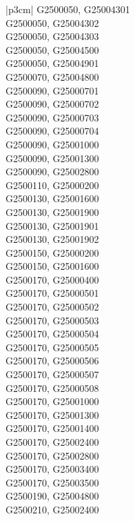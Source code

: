 \begin{customLongTable}{ |p{3cm}| }
G2500050, G25004301 \\ \hline
G2500050, G25004302 \\ \hline
G2500050, G25004303 \\ \hline
G2500050, G25004500 \\ \hline
G2500050, G25004901 \\ \hline
G2500070, G25004800 \\ \hline
G2500090, G25000701 \\ \hline
G2500090, G25000702 \\ \hline
G2500090, G25000703 \\ \hline
G2500090, G25000704 \\ \hline
G2500090, G25001000 \\ \hline
G2500090, G25001300 \\ \hline
G2500090, G25002800 \\ \hline
G2500110, G25000200 \\ \hline
G2500130, G25001600 \\ \hline
G2500130, G25001900 \\ \hline
G2500130, G25001901 \\ \hline
G2500130, G25001902 \\ \hline
G2500150, G25000200 \\ \hline
G2500150, G25001600 \\ \hline
G2500170, G25000400 \\ \hline
G2500170, G25000501 \\ \hline
G2500170, G25000502 \\ \hline
G2500170, G25000503 \\ \hline
G2500170, G25000504 \\ \hline
G2500170, G25000505 \\ \hline
G2500170, G25000506 \\ \hline
G2500170, G25000507 \\ \hline
G2500170, G25000508 \\ \hline
G2500170, G25001000 \\ \hline
G2500170, G25001300 \\ \hline
G2500170, G25001400 \\ \hline
G2500170, G25002400 \\ \hline
G2500170, G25002800 \\ \hline
G2500170, G25003400 \\ \hline
G2500170, G25003500 \\ \hline
G2500190, G25004800 \\ \hline
G2500210, G25002400 \\ \hline

\end{customLongTable}
